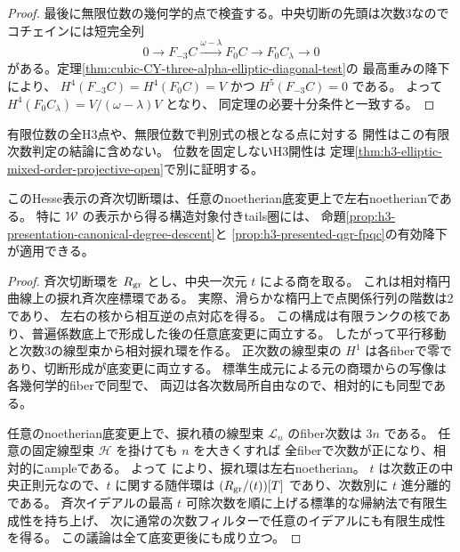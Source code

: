\begin{proof}
最後に無限位数の幾何学的点で検査する。中央切断の先頭は次数3なので
コチェインには短完全列
\[
 0\longrightarrow F_{-3}C
   \xrightarrow{\omega-\lambda} F_0C
   \longrightarrow F_0 C_\lambda\longrightarrow0
\]
がある。定理\ref{thm:cubic-CY-three-alpha-elliptic-diagonal-test}の
最高重みの降下により、
$H^4(F_{-3}C)=H^4(F_0C)=V$ かつ $H^5(F_{-3}C)=0$ である。
よって $H^4(F_0C_\lambda)=V/(\omega-\lambda)V$ となり、
同定理の必要十分条件と一致する。
\end{proof}

\begin{remark}
有限位数の全H3点や、無限位数で判別式の根となる点に対する
開性はこの有限次数判定の結論に含めない。
位数を固定しないH3開性は
定理\ref{thm:h3-elliptic-mixed-order-projective-open}で別に証明する。
\end{remark}

\begin{corollary}\label{cor:cubic-CY-three-alpha-elliptic-strong-noetherian}
このHesse表示の斉次切断環は、任意のnoetherian底変更上で左右noetherianである。
特に $\mathcal W$ の表示から得る構造対象付きtails圏には、
命題\ref{prop:h3-presentation-canonical-degree-descent}と
\ref{prop:h3-presented-qgr-fpqc}の有効降下が適用できる。
\end{corollary}
\begin{proof}
斉次切断環を $R_{\rm gr}$ とし、中央一次元 $t$ による商を取る。
これは相対楕円曲線上の捩れ斉次座標環である。
実際、滑らかな楕円上で点関係行列の階数は2であり、
左右の核から相互逆の点対応を得る。
この構成は有限ランクの核であり、普遍係数底上で形成した後の任意底変更に両立する。
したがって平行移動と次数3の線型束から相対捩れ環を作る。
正次数の線型束の $H^1$ は各fiberで零であり、切断形成が底変更に両立する。
標準生成元による元の商環からの写像は各幾何学的fiberで同型で、
両辺は各次数局所自由なので、相対的にも同型である。

任意のnoetherian底変更上で、捩れ積の線型束 $\mathcal L_n$ のfiber次数は $3n$ である。
任意の固定線型束 $\mathcal H$ を掛けても $n$ を大きくすれば
全fiberで次数が正になり、相対的にampleである。
よって \cite[定理1.3, 7.14]{KeelerAmpleFilters} により、捩れ環は左右noetherian。
$t$ は次数正の中央正則元なので、$t$ に関する随伴環は
$(R_{\rm gr}/(t))[T]$ であり、次数別に $t$ 進分離的である。
斉次イデアルの最高 $t$ 可除次数を順に上げる標準的な帰納法で有限生成性を持ち上げ、
次に通常の次数フィルターで任意のイデアルにも有限生成性を得る。
この議論は全て底変更後にも成り立つ。
\end{proof}

